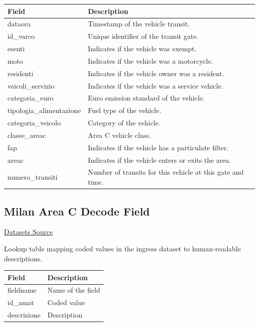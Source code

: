 \documentclass{article}
\begin{document}
	\begin{table}[H]
		\centering
		\begin{tabular}{ll}
			\hline
			Field & Description \\
			\hline
			dataora & Timestamp of the vehicle transit. \\
			id\_varco & Unique identifier of the transit gate. \\
			esenti & Indicates if the vehicle was exempt. \\
			moto & Indicates if the vehicle was a motorcycle. \\
			residenti & Indicates if the vehicle owner was a resident. \\
			veicoli\_servizio & Indicates if the vehicle was a service vehicle. \\
			categoria\_euro & Euro emission standard of the vehicle. \\
			tipologia\_alimentazione & Fuel type of the vehicle. \\
			categoria\_veicolo & Category of the vehicle. \\
			classe\_areac & Area C vehicle class. \\
			fap & Indicates if the vehicle has a particulate filter. \\
			areac & Indicates if the vehicle enters or exits the area. \\
			numero\_transiti & Number of transits for this vehicle at this gate and time. \\
			\hline
		\end{tabular}
	\end{table}
	
	\subsection{Milan Area C Decode Field}
	
	\href{https://dati.comune.milano.it/dataset/0b396fd4-bdad-4588-89f8-1468c5451c49}{Datasets Source}
	
	Lookup table mapping coded values in the ingress dataset to human-readable descriptions.
	
	\begin{table}[H]
		\centering
		\begin{tabular}{ll}
			\hline
			Field & Description \\
			\hline
			fieldname & Name of the field \\
			id\_amat & Coded value \\
			descrizione & Description \\
			\hline
		\end{tabular}
	\end{table}
	
\end{document}
